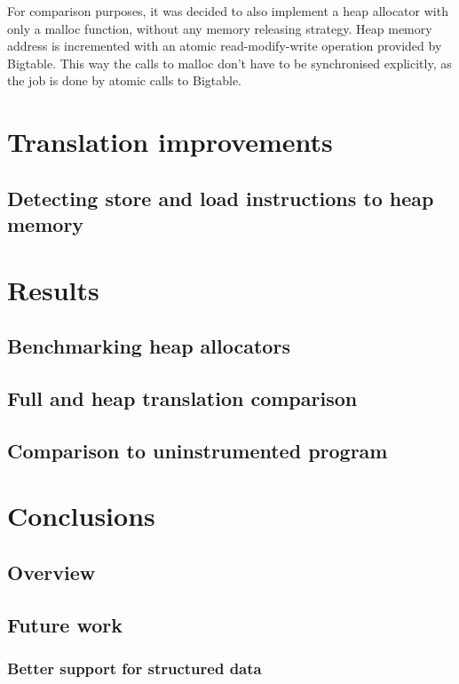 \documentclass[bsc,frontabs,twoside,singlespacing,parskip,deptreport]{infthesis}     %
\begin{document}
For comparison purposes, it was decided to also implement a heap allocator with only a malloc function, without any memory releasing strategy. Heap memory address is incremented with an atomic read-modify-write operation provided by Bigtable. This way the calls to malloc don't have to be synchronised explicitly, as the job is done by atomic calls to Bigtable. 

\chapter{Translation improvements}


\section{Detecting store and load instructions to heap memory}

\chapter{Results}

\section{Benchmarking heap allocators}

\section{Full and heap translation comparison}

\section{Comparison to uninstrumented program}

\chapter{Conclusions}

\section{Overview}

\section{Future work}

\subsection{Better support for structured data}




\end{document}
